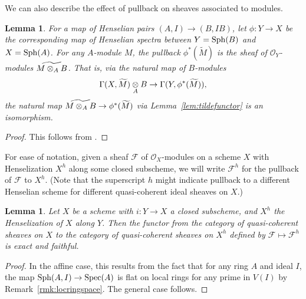 \documentclass[12pt]{article}
\renewcommand{\O}{\mathscr{O}}
\newcommand{\F}{\mathcal{F}}
\newcommand{\spec}{{\rm Spec}}
\newcommand{\sph}{{\rm Sph}}
\newcommand{\spcite}[2]{\cite[\href{https://stacks.math.columbia.edu/tag/#1}{{#2} {#1}}]{stackp}}
\newtheorem{lemma}[theorem]{Lemma}
\theoremstyle{definition}
\numberwithin{equation}{subsection}
\begin{document}
We can also describe the effect of pullback on sheaves associated to modules.

\begin{lemma}\label{lem:modpull} For a map of Henselian pairs $(A,I) \to (B,IB)$, let $\phi: Y \to X$ be the corresponding map of Henselian spectra between $Y = \sph(B)$ and $X = \sph(A)$. For any $A$-module $M$, the pullback $\phi^*(\widetilde{M})$ is the sheaf of $\O_Y$-modules $\widetilde{M \tens_A B}$. That is, via the natural map of $B$-modules $$\Gamma(X,\widetilde{M}) \tens_A B \to \Gamma(Y,\phi^*(\widetilde{M})),$$ the natural map $\widetilde{M \tens_A B} \to \phi^*(\widetilde{M})$ via Lemma~\ref{lem:tildefunctor} is an isomorphism.
\end{lemma}
\begin{proof} This follows from \spcite{01BJ}{Lemma}.\end{proof}



For ease of notation, given a sheaf $\F$ of $\O_X$-modules on a scheme $X$ with Henselization $X^h$ along some closed subscheme, we will write $\F^h$ for the pullback of $\F$ to $X^h$. (Note that the superscript $h$ might indicate pullback to a different Henselian scheme for different quasi-coherent ideal sheaves on $X$.) 

\begin{lemma}\label{lem:hensfaithexact} Let $X$ be a scheme with $i: Y \to X$ a closed subscheme, and $X^h$ the Henselization of $X$ along $Y$. Then the functor from the category of quasi-coherent sheaves on $X$ to the category of quasi-coherent sheaves on $X^h$ defined by $\F \mapsto \F^h$ is exact and faithful.
\end{lemma}
\begin{proof} In the affine case, this results from the fact that for any ring $A$ and ideal $I$, the map $\sph(A,I) \to \spec(A)$ is flat on local rings for any prime in $V(I)$ by Remark~\ref{rmk:locringspace}. The general case follows.\end{proof}
\end{document}
